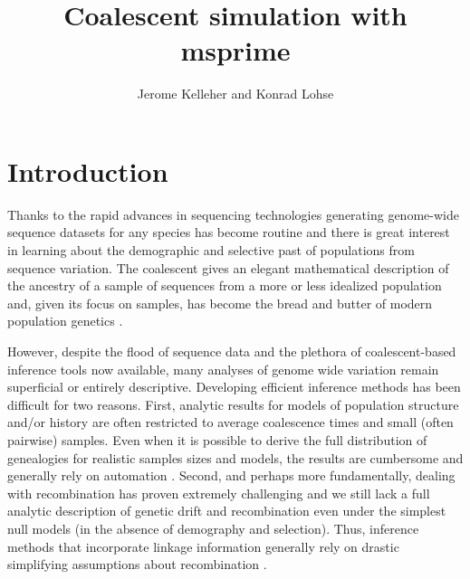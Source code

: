 \documentclass[graybox]{svmult}
\begin{document}
\title*{Coalescent simulation with msprime}
\author{Jerome Kelleher and Konrad Lohse}
%
%
\maketitle





\section{Introduction}
\label{sec:introduction}

Thanks to the rapid advances in sequencing technologies generating
genome-wide sequence datasets for any species has become routine and
there is great interest in learning about the demographic and selective
past of populations from sequence variation. The coalescent gives an
elegant mathematical description of the ancestry of a sample of
sequences from a more or less idealized population and, given its focus
on samples, has become the bread and butter of modern population
genetics \citep{hudson1985the, Wakeley2009}.

However, despite the flood of sequence data and the plethora of
coalescent-based inference tools now available, many analyses of genome
wide variation remain superficial or entirely descriptive. Developing
efficient inference methods has been difficult for two reasons. First,
analytic results for models of population structure and/or history are
often restricted to average coalescence times and small (often pairwise)
samples. Even when it is possible to derive the full distribution of
genealogies for realistic samples sizes and models, the results are
cumbersome and generally rely on automation \citep{Lohse2016}. Second, and
perhaps more fundamentally, dealing with recombination has proven
extremely challenging and we still lack a full analytic description of
genetic drift and recombination even under the simplest null models (in
the absence of demography and selection). Thus, inference methods that
incorporate linkage information generally rely on drastic simplifying
assumptions about recombination \citep{mcvean2005approximating, }.
\end{document}
